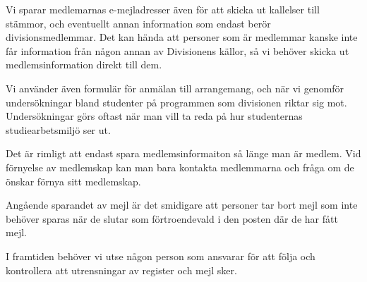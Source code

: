 \documentclass[protokoll]{dvd}
\begin{document}
Vi sparar medlemarnas e-mejladresser även för att skicka ut kallelser till stämmor, och eventuellt annan information som endast berör divisionsmedlemmar.
Det kan hända att personer som är medlemmar kanske inte får information från någon annan av Divisionens källor, så vi behöver skicka ut medlemsinformation direkt till dem.

Vi använder även formulär för anmälan till arrangemang, och när vi genomför undersökningar bland studenter på programmen som divisionen riktar sig mot.
Undersökningar görs oftast när man vill ta reda på hur studenternas studiearbetsmiljö ser ut.

Det är rimligt att endast spara medlemsinformaiton så länge man är medlem.
Vid förnyelse av medlemskap kan man bara kontakta medlemmarna och fråga om de önskar förnya sitt medlemskap.

Angående sparandet av mejl är det smidigare att personer tar bort mejl som inte behöver sparas när de slutar som förtroendevald i den posten där de har fått mejl.

I framtiden behöver vi utse någon person som ansvarar för att följa och kontrollera att utrensningar av register och mejl sker.
\end{document}

